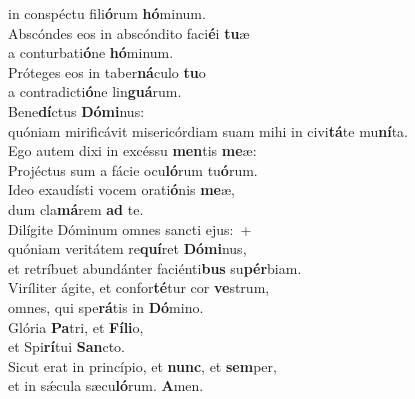 \evenverse in conspéctu fili\textbf{ó}rum \textbf{hó}minum.\\
\oddverse Abscóndes eos in abscóndito faci\textbf{é}i \textbf{tu}æ~\*\\
\oddverse a conturbati\textbf{ó}ne \textbf{hó}minum.\\
\evenverse Próteges eos in taber\textbf{ná}culo \textbf{tu}o~\*\\
\evenverse a contradicti\textbf{ó}ne lin\textbf{guá}rum.\\
\oddverse Bene\textbf{dí}ctus \textbf{Dó}\textbf{mi}nus:~\*\\
\oddverse quóniam mirificávit misericórdiam suam mihi in civi\textbf{tá}te mu\textbf{ní}ta.\\
\evenverse Ego autem dixi in excéssu \textbf{men}tis \textbf{me}æ:~\*\\
\evenverse Projéctus sum a fácie ocu\textbf{ló}rum tu\textbf{ó}rum.\\
\oddverse Ideo exaudísti vocem orati\textbf{ó}nis \textbf{me}æ,~\*\\
\oddverse dum cla\textbf{má}rem \textbf{ad} te.\\
\evenverse Dilígite Dóminum omnes sancti ejus:~+\\
\evenverse  quóniam veritátem re\textbf{quí}ret \textbf{Dó}\textbf{mi}nus,~\*\\
\evenverse et retríbuet abundánter faciénti\textbf{bus} su\textbf{pér}biam.\\
\oddverse Viríliter ágite, et confor\textbf{té}tur cor \textbf{ve}strum,~\*\\
\oddverse omnes, qui spe\textbf{rá}tis in \textbf{Dó}mino.\\
\evenverse Glória \textbf{Pa}tri, et \textbf{Fí}\textbf{li}o,~\*\\
\evenverse et Spi\textbf{rí}tui \textbf{San}cto.\\
\oddverse Sicut erat in princípio, et \textbf{nunc}, et \textbf{sem}per,~\*\\
\oddverse et in sǽcula sæcu\textbf{ló}rum. \textbf{A}men.\\
